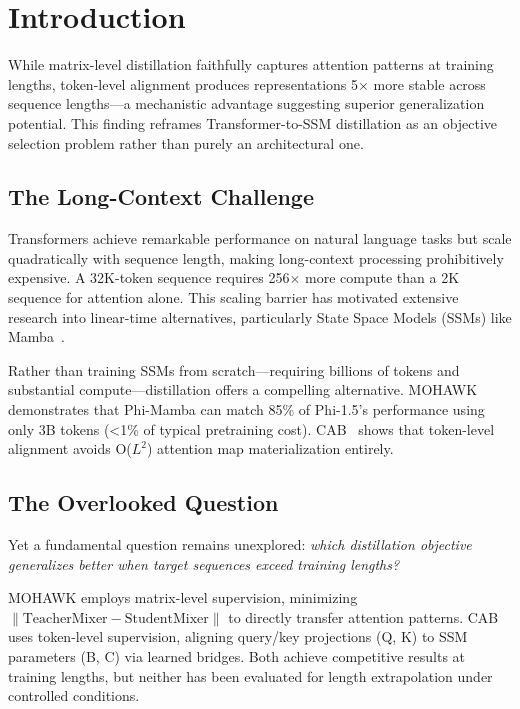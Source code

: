 \section{Introduction}

While matrix-level distillation faithfully captures attention patterns at training lengths, token-level alignment produces representations 5$\times$ more stable across sequence lengths---a mechanistic advantage suggesting superior generalization potential. This finding reframes Transformer-to-SSM distillation as an objective selection problem rather than purely an architectural one.

\subsection{The Long-Context Challenge}

Transformers achieve remarkable performance on natural language tasks but scale quadratically with sequence length, making long-context processing prohibitively expensive. A 32K-token sequence requires 256$\times$ more compute than a 2K sequence for attention alone. This scaling barrier has motivated extensive research into linear-time alternatives, particularly State Space Models (SSMs) like Mamba~\cite{gu2023mamba}.

Rather than training SSMs from scratch---requiring billions of tokens and substantial compute---distillation offers a compelling alternative. MOHAWK~\cite{bick2024mohawk} demonstrates that Phi-Mamba can match 85\% of Phi-1.5's performance using only 3B tokens (<1\% of typical pretraining cost). CAB~\cite{wang2025cab} shows that token-level alignment avoids O($L^2$) attention map materialization entirely.

\subsection{The Overlooked Question}

Yet a fundamental question remains unexplored: \emph{which distillation objective generalizes better when target sequences exceed training lengths?}

MOHAWK employs matrix-level supervision, minimizing $\|\text{TeacherMixer} - \text{StudentMixer}\|$ to directly transfer attention patterns. CAB uses token-level supervision, aligning query/key projections (Q, K) to SSM parameters (B, C) via learned bridges. Both achieve competitive results at training lengths, but neither has been evaluated for length extrapolation under controlled conditions.

